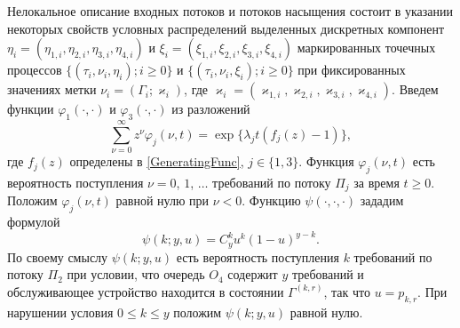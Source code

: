 \documentclass[a4paper,12pt,russian]{extarticle}
\begin{document}
Нелокальное описание входных потоков и потоков насыщения состоит в указании некоторых свойств условных распределений выделенных дискретных компонент $\eta_i=(\eta_{1,i},\eta_{2,i}, \eta_{3,i}, \eta_{4,i})$ и $\xi_i=(\xi_{1,i}, \xi_{2,i}, \xi_{3,i}, \xi_{4,i})$ маркированных точечных процессов \linebreak $\{(\tau_i, \nu_i, \eta_i); i\geqslant 0\}$ и $\{(\tau_i, \nu_i, \xi_i); i\geqslant 0\}$ при фиксированных значениях метки $\nu_i = (\Gamma_i;\varkappa_i)$, где $\varkappa_i=(\varkappa_{1,i},\varkappa_{2,i},\varkappa_{3,i},\varkappa_{4,i})$. 
Введем функции $\varphi_1(\cdot,\cdot)$ и $\varphi_3(\cdot,\cdot)$ из разложений 
\begin{equation*}
\sum_{\nu=0}^{\infty} z^\nu\varphi_j(\nu,t) = \exp\{\lambda_j t (f_j(z)-1)\},
\end{equation*}
где $f_j(z)$ определены в \eqref{GeneratingFunc}, $j \in \{1,3\}$. Функция $\varphi_j(\nu,t)$ есть вероятность поступления $\nu=0$, $1$, $\ldots$ требований по потоку $\Pi_j$ за время $t \geqslant 0$. Положим $\varphi_j(\nu,t)$ равной нулю при $\nu < 0$. Функцию $\psi(\cdot,\cdot,\cdot)$ зададим формулой
\begin{equation*}
\psi(k;y,u)=C_y^k u^k (1-u)^{y-k}.	
\end{equation*}
По своему смыслу $\psi(k;y,u)$ есть вероятность поступления $k$ требований по потоку $\Pi_2$ при условии, что очередь $O_4$ содержит $y$ требований и обслуживающее устройство находится в состоянии $\Gamma^{(k,r)}$, так что $u=p_{k,r}$. При нарушении условия $ 0\leqslant k \leqslant y$ положим $\psi(k;y,u)$ равной нулю.
\end{document}
